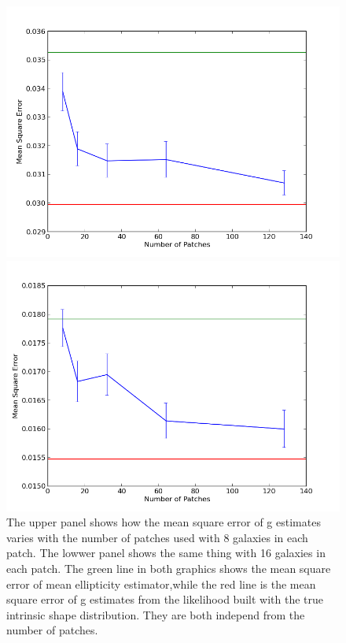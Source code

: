 \documentclass[useAMS,usenatbib]{mn2e}
\begin{document}
\begin{figure}
\includegraphics[scale=0.48]{fig/Np_step}

\includegraphics[scale=0.48]{fig/N16NP_vary}

\caption{The upper panel shows how the mean square error of g estimates varies
with the number of patches used with 8 galaxies in each patch. The
lowwer panel shows the same thing with 16 galaxies in each patch. The green line in both graphics shows the mean square error of mean ellipticity estimator,while the red line is the mean square error of g estimates from the likelihood built with the true intrinsic shape distribution. They are both independ from the number of patches. }
\end{figure}
\end{document}
